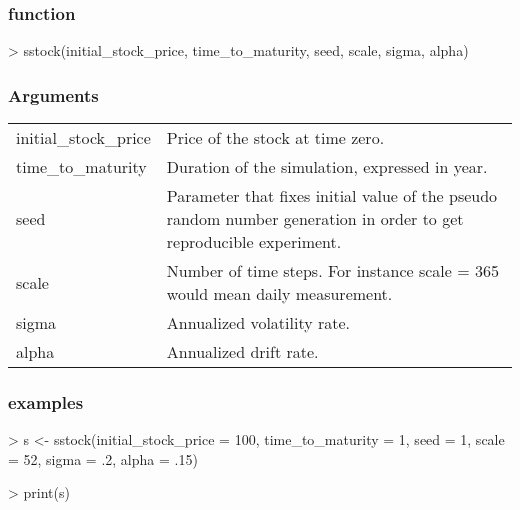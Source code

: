 \documentclass[12pt]{report}
\begin{document}
\begin{appendices}
\subsubsection*{function}

\begin{Schunk}
\begin{Sinput}
> sstock(initial_stock_price, time_to_maturity, 
        seed, scale, sigma, alpha)
\end{Sinput}
\end{Schunk}

\subsubsection*{Arguments}

\begin{tabularx}{\textwidth}{lX}
  initial\_stock\_price & Price of the stock at time zero.\\
  time\_to\_maturity & Duration of the simulation, expressed in year.\\
  seed & Parameter that fixes initial value of the pseudo random number generation in order to get reproducible experiment. \\
  scale & Number of time steps. For instance scale = 365 would mean daily measurement.\\
  sigma & Annualized volatility rate. \\
  alpha & Annualized drift rate.
\end{tabularx}

\subsubsection*{examples}
\label{sec:r:time:geometric:ex}

\begin{Schunk}
\begin{Sinput}
> s <- sstock(initial_stock_price = 100,
        time_to_maturity = 1,
        seed = 1,
        scale = 52,
        sigma = .2,
        alpha = .15)
\end{Sinput}
\end{Schunk}


\begin{Schunk}
\begin{Sinput}
> print(s)
\end{Sinput}
\end{Schunk}


\end{appendices}
\end{document}
